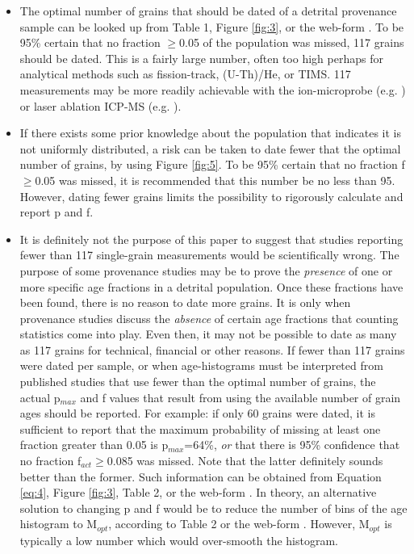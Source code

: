 \documentclass[12]{article}
\begin{document}
\begin{itemize}
\item The optimal number of grains  that should be dated of a detrital
provenance sample can  be looked up from Table  1, Figure \ref{fig:3},
or the web-form  \cite{webform}.  To be 95\% certain  that no fraction
$\geq$0.05 of the  population was missed, 117 grains  should be dated.
This is a  fairly large number, often too  high perhaps for analytical
methods such  as fission-track, (U-Th)/He, or  TIMS.  117 measurements
may  be   more  readily  achievable  with   the  ion-microprobe  (e.g.
\cite{avigad2003})        or        laser       ablation        ICP-MS
(e.g. \cite{dickinson2003}).
\item If there  exists some prior knowledge about  the population that
indicates it is not uniformly distributed, a risk can be taken to date
fewer that the optimal number  of grains, by using Figure \ref{fig:5}.
To  be 95\% certain  that no  fraction f$\geq$0.05  was missed,  it is
recommended  that this  number be  no less  than 95.   However, dating
fewer grains limits the possibility to rigorously calculate and report
p and f.
\item It is  definitely not the purpose of this  paper to suggest that
studies reporting  fewer than  117 single-grain measurements  would be
scientifically wrong.   The purpose of some provenance  studies may be
to prove the {\it presence} of one or more specific age fractions in a
detrital population.   Once these fractions have been  found, there is
no reason  to date  more grains.  It  is only when  provenance studies
discuss  the {\it  absence}  of certain  age  fractions that  counting
statistics come into play.  Even then,  it may not be possible to date
as many as  117 grains for technical, financial  or other reasons.  If
fewer than  117 grains were  dated per sample, or  when age-histograms
must be  interpreted from  published studies that  use fewer  than the
optimal  number of  grains, the  actual  p$_{max}$ and  f values  that
result  from  using the  available  number  of  grain ages  should  be
reported.  For example: if only 60 grains were dated, it is sufficient
to  report  that the  maximum  probability  of  missing at  least  one
fraction greater than  0.05 is p$_{max}$=64\%, {\it or}  that there is
95\% confidence that no  fraction f$_{act}\geq$0.085 was missed.  Note
that  the  latter definitely  sounds  better  than  the former.   Such
information   can  be  obtained   from  Equation   \ref{eq:4},  Figure
\ref{fig:3}, Table  2, or the web-form \cite{webform}.   In theory, an
alternative solution to changing p and f would be to reduce the number
of bins of the age histogram to M$_{opt}$, according to Table 2 or the
web-form \cite{webform}.  However, M$_{opt}$ is typically a low number
which would over-smooth the histogram.
\end{itemize}
\end{document}

